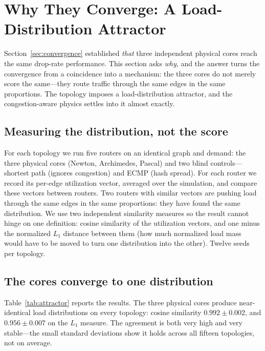 \section{Why They Converge: A Load-Distribution Attractor}
\label{sec:attractor}

Section~\ref{sec:convergence} established \emph{that} three independent physical
cores reach the same drop-rate performance. This section asks \emph{why}, and
the answer turns the convergence from a coincidence into a mechanism: the three
cores do not merely score the same---they route traffic through the same edges
in the same proportions. The topology imposes a load-distribution attractor, and
the congestion-aware physics settles into it almost exactly.

\subsection{Measuring the distribution, not the score}

For each topology we run five routers on an identical graph and demand: the three
physical cores (Newton, Archimedes, Pascal) and two blind controls---shortest
path (ignores congestion) and ECMP (hash spread). For each router we record its
per-edge utilization vector, averaged over the simulation, and compare these
vectors between routers. Two routers with similar vectors are pushing load
through the same edges in the same proportions: they have found the same
distribution. We use two independent similarity measures so the result cannot
hinge on one definition: cosine similarity of the utilization vectors, and one
minus the normalized $L_1$ distance between them (how much normalized load mass
would have to be moved to turn one distribution into the other). Twelve seeds per
topology.

\subsection{The cores converge to one distribution}

Table~\ref{tab:attractor} reports the results. The three physical cores produce
near-identical load distributions on every topology: cosine similarity
$0.992 \pm 0.002$, and $0.956 \pm 0.007$ on the $L_1$ measure. The agreement is
both very high and very stable---the small standard deviations show it holds
across all fifteen topologies, not on average.

